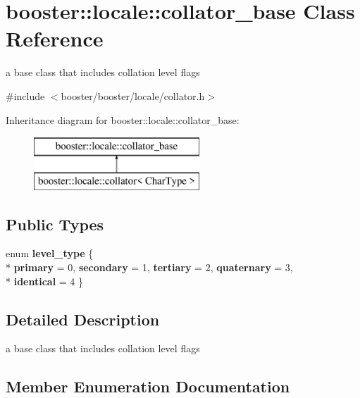 \section{booster\+:\+:locale\+:\+:collator\+\_\+base Class Reference}
\label{classbooster_1_1locale_1_1collator__base}


a base class that includes collation level flags  




{\ttfamily \#include $<$booster/booster/locale/collator.\+h$>$}

Inheritance diagram for booster\+:\+:locale\+:\+:collator\+\_\+base\+:\begin{figure}[H]
\begin{center}
\leavevmode
\includegraphics[height=2.000000cm]{classbooster_1_1locale_1_1collator__base}
\end{center}
\end{figure}
\subsection*{Public Types}
\begin{DoxyCompactItemize}
\item 
enum {\bf level\+\_\+type} \{ \\*
{\bf primary} = 0, 
{\bf secondary} = 1, 
{\bf tertiary} = 2, 
{\bf quaternary} = 3, 
\\*
{\bf identical} = 4
 \}
\end{DoxyCompactItemize}


\subsection{Detailed Description}
a base class that includes collation level flags 

\subsection{Member Enumeration Documentation}
